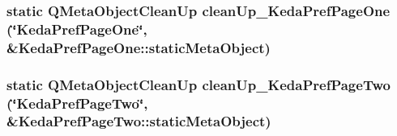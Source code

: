 \subsubsection{\setlength{\rightskip}{0pt plus 5cm}static QMeta\-Object\-Clean\-Up clean\-Up\_\-Keda\-Pref\-Page\-One (\char`\"{}Keda\-Pref\-Page\-One\char`\"{}, \&Keda\-Pref\-Page\-One::static\-Meta\-Object)\hspace{0.3cm}{\tt  [static]}}\label{src_2pref_8moc_b487d845c1fffef1782503c8f833d4aa}


\subsubsection{\setlength{\rightskip}{0pt plus 5cm}static QMeta\-Object\-Clean\-Up clean\-Up\_\-Keda\-Pref\-Page\-Two (\char`\"{}Keda\-Pref\-Page\-Two\char`\"{}, \&Keda\-Pref\-Page\-Two::static\-Meta\-Object)\hspace{0.3cm}{\tt  [static]}}\label{src_2pref_8moc_b478bd9ccb7e9776c6663057f0c9a8d1}


